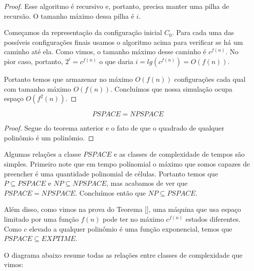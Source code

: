 \begin{proof}
  Esse algoritmo é recursivo e, portanto, precisa manter uma pilha de recursão.
  O tamanho máximo dessa pilha é $i$.

  Começamos da representação da configuração inicial $C_0$.
  Para cada uma das possíveis configurações finais usamos o algoritmo acima para verificar se há um caminho até ela.
  Como vimos, o tamanho máximo desse caminho é $c^{f(n)}$.
  No pior caso, portanto, $2^i = c^{f(n)}$ o que daria $i = lg(c^{f(n)}) = O(f(n))$.

  Portanto temos que armazenar no máximo $O(f(n))$ configurações cada qual com tamanho máximo $O(f(n))$.
  Concluímos que nossa simulação ocupa espaço $O(f^2(n))$.
\end{proof}

\begin{corollary}
  \begin{displaymath}
    PSPACE = NPSPACE
  \end{displaymath}
\end{corollary}
\begin{proof}
  Segue do teorema anterior e o fato de que o quadrado de qualquer polinômio é um polinômio.
\end{proof}


Algumas relações a classe $PSPACE$ e as classes de complexidade de tempos são simples.
Primeiro note que em tempo polínomial o máximo que somos capazes de preencher é uma quantidade polinomial de células.
Portanto temos que $P \subseteq PSPACE$ e $NP \subseteq NPSPACE$, mas acabamos de ver que $PSPACE = NPSPACE$.
Concluímos então que $NP \subseteq PSPACE$.

Além disso, como vimos na prova do Teorema \ref{}, uma máquina que usa espaço limitado por uma função $f(n)$ pode ter no máximo $c^{f(n)}$ estados diferentes.
Como $c$ elevado a qualquer polinômio é uma função exponencial, temos que $PSPACE \subseteq EXPTIME$.

O diagrama abaixo resume todas as relações entre classes de complexidade que vimos:

